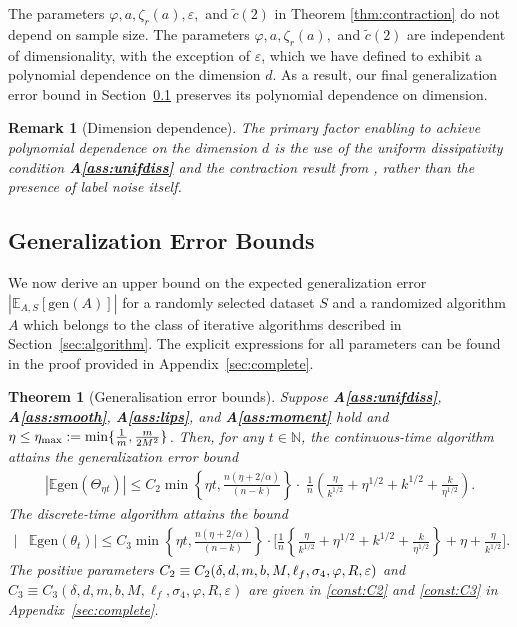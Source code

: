\documentclass{article}
\newtheorem{theorem}{Theorem}
\newtheorem{remark}{Remark}
\begin{document}
The parameters $\varphi, a, \zeta_r(a), \varepsilon,$ and $\tilde{c}(2)$ in Theorem \ref{thm:contraction} do not depend on sample size. The parameters $\varphi, a, \zeta_r(a),$ and $\tilde{c}(2)$ are independent of dimensionality, with the exception of $\varepsilon$, which we have defined to exhibit a polynomial dependence on the dimension $d$. As a result, our final generalization error bound in Section~\ref{sec:MainResultGenErrBound} preserves its polynomial dependence on dimension.

\begin{remark}[Dimension dependence]
    The primary factor enabling to achieve polynomial dependence on the dimension $d$ is the use of the uniform dissipativity condition \textbf{A\ref{ass:unifdiss}} and the contraction result from \citet{Wang}, rather than the presence of label noise itself.
\end{remark}

\subsection{Generalization Error Bounds}\label{sec:MainResultGenErrBound}
We now derive an upper bound on the expected generalization error $|\mathbb{E}_{A, S} [\mathrm{gen}(A)]|$ for a randomly selected dataset $S$ and a randomized algorithm $A$ which belongs to the class of iterative algorithms described in Section~\ref{sec:algorithm}. The explicit expressions for all parameters can be found in the proof  provided in Appendix~\ref{sec:complete}.

\begin{theorem}[Generalisation error bounds]\label{thm:genbound}
    Suppose \textbf{A\ref{ass:unifdiss}}, \textbf{A\ref{ass:smooth}}, \textbf{A\ref{ass:lips}}, and \textbf{A\ref{ass:moment}} hold and $\eta \leq \eta_{\max} := \min\{\frac{1}{m}, \\\frac{m}{2M^2}\}$. Then, for any $t \in \mathbb{N}$, the continuous-time algorithm attains the generalization error bound
    \begin{align}
        |\mathbb{E} \mathrm{gen}(\Theta_{\eta t})| \leq C_2 \min \left\{\eta t, \frac{n(\eta +2/\alpha)}{(n-k)} \right\} 
        \cdot \; \frac{1}{n}   \left(\frac{\eta}{k^{1/2}}  +\eta^{1/2} + k^{1/2}  +  \frac{k}{\eta^{1/2}} \right).\label{eq:ctsbound}
    \end{align}
    The discrete-time algorithm attains the bound
    \begin{align}
        |&\mathbb{E} \mathrm{gen}(\theta_t)| \leq C_3 \min \left\{\eta t, \frac{n(\eta +2/\alpha)}{(n-k)} \right\} 
        \cdot \bigg[\frac{1}{n}\left\{\frac{\eta}{k^{1/2}}  +\eta^{1/2} + k^{1/2}  +  \frac{k}{\eta^{1/2}} \right\} + \eta  + \frac{\eta}{k^{1/2}} \bigg].\label{eq:discretebound}
    \end{align}
    The positive parameters %
    $C_2 \equiv C_2(\delta, d, m, b, M, \ell_f, \sigma_4, \\\varphi, R, \varepsilon)$ and $C_3 \equiv C_3(\delta, d, m, b, M, \ell_f, \sigma_4, \varphi, R, \varepsilon)$ are given in \eqref{const:C2} and \eqref{const:C3} in Appendix~\ref{sec:complete}.
\end{theorem}
\end{document}
